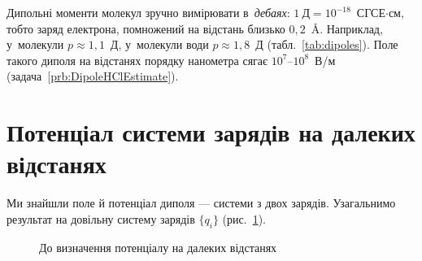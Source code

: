Дипольні моменти молекул зручно вимірювати в~\emph{дебаях}: $1~\text{Д}=10^{-18}$~СГСЕ$\cdot$см,
тобто заряд електрона, помножений на відстань близько $0{,}2$~\AA. Наприклад, у~молекули
 $p\approx1{,}1$~Д, у~молекули води $p\approx1{,}8$~Д (табл.~\ref{tab:dipoles}).
Поле такого диполя на відстанях порядку нанометра сягає $10^{7}$--$10^{8}$~В/м
(задача~\ref{prb:DipoleHClEstimate}).



\section{Потенціал системи зарядів на далеких відстанях}\hypertarget{far-field-potential}{}

Ми знайшли поле й потенціал диполя --- системи з двох зарядів. Узагальнимо результат на довільну систему зарядів $\{q_i\}$ (рис.~\ref{tikz:far_potential}).

\begin{figure}[h!]\centering
	\caption{До визначення потенціалу на далеких відстанях}
	\label{tikz:far_potential}
\end{figure}

